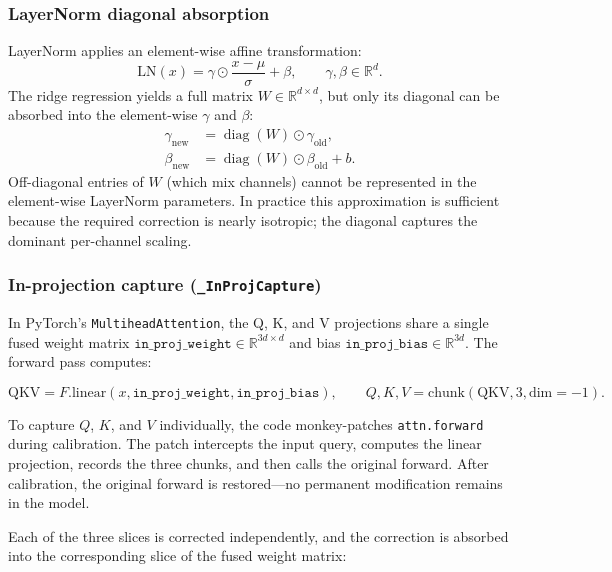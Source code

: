\documentclass[11pt,a4paper]{article}
\begin{document}
\subsubsection{LayerNorm diagonal absorption}
\label{subsec:ln_diag}

LayerNorm applies an element-wise affine transformation:
\begin{equation}
    \mathrm{LN}(x) = \gamma \odot \frac{x - \mu}{\sigma} + \beta,
    \qquad \gamma, \beta \in \mathbb{R}^{d}.
\end{equation}
The ridge regression yields a full matrix $W \in \mathbb{R}^{d \times d}$, but
only its diagonal can be absorbed into the element-wise $\gamma$ and $\beta$:
\begin{align}
    \gamma_{\text{new}} &= \operatorname{diag}(W) \odot \gamma_{\text{old}}, \\
    \beta_{\text{new}} &= \operatorname{diag}(W) \odot \beta_{\text{old}} + b .
\end{align}
Off-diagonal entries of $W$ (which mix channels) cannot be represented in the
element-wise LayerNorm parameters. In practice this approximation is
sufficient because the required correction is nearly isotropic; the diagonal
captures the dominant per-channel scaling.

\subsubsection{In-projection capture (\texttt{\_InProjCapture})}

In PyTorch's \texttt{MultiheadAttention}, the Q, K, and V projections share a
single fused weight matrix $\texttt{in\_proj\_weight} \in \mathbb{R}^{3d \times d}$
and bias $\texttt{in\_proj\_bias} \in \mathbb{R}^{3d}$. The forward pass
computes:

\begin{equation}
    \text{QKV} = F.\text{linear}(x, \texttt{in\_proj\_weight},
    \texttt{in\_proj\_bias}), \qquad
    Q, K, V = \text{chunk}(\text{QKV}, 3, \text{dim}=-1).
\end{equation}

To capture $Q$, $K$, and $V$ individually, the code monkey-patches
\texttt{attn.forward} during calibration. The patch intercepts the input
query, computes the linear projection, records the three chunks, and then
calls the original forward. After calibration, the original forward is
restored---no permanent modification remains in the model.

Each of the three slices is corrected independently, and the correction is
absorbed into the corresponding slice of the fused weight matrix:
\end{document}
